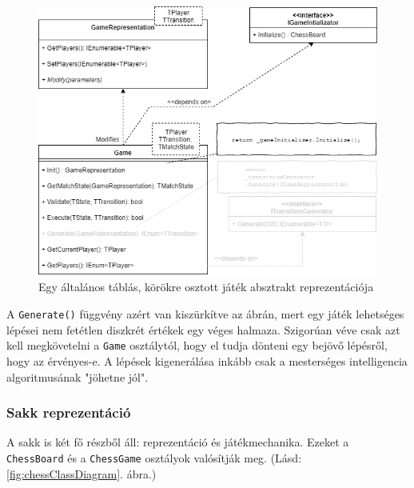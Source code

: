 \documentclass[twoside, a4paper, 12pt]{article}
\begin{document}
\begin{figure}[htbp]
	\centering
	\includegraphics[width=\textwidth]{img/boardGameAbstractClassDiagram.png}
	\caption{Egy általános táblás, körökre osztott játék absztrakt reprezentációja}
	\label{fig:boardGameAbstractClassDiagram}
\end{figure}

A \texttt{Generate()} függvény azért van kiszürkítve az ábrán, mert egy játék lehetséges lépései nem fetétlen diszkrét értékek egy véges halmaza. Szigorúan véve csak azt kell megkövetelni a \texttt{Game} osztálytól, hogy el tudja dönteni egy bejövő lépésről, hogy az érvényes-e. A lépések kigenerálása inkább csak a mesterséges intelligencia algoritmusának "jöhetne jól".

\subsubsection{Sakk reprezentáció}

A sakk is két fő részből áll: reprezentáció és játékmechanika. Ezeket a \texttt{ChessBoard} és a \texttt{ChessGame} osztályok valósítják meg. (Lásd: \ref{fig:chessClassDiagram}. ábra.)
\end{document}
